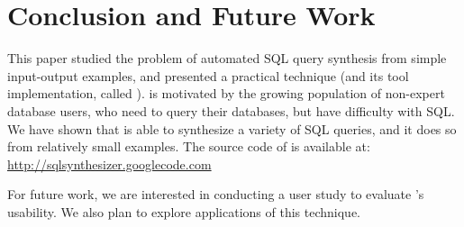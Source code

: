 \section{Conclusion and Future Work}
\label{sec:conclusion}




This paper studied the problem of automated SQL query synthesis
from simple input-output examples, and presented a
practical technique (and its tool implementation, called \ourtool).
\ourtool is motivated by the growing population of
non-expert database users, who need to query their
databases, but have difficulty with SQL.
We have shown that \ourtool is
able to synthesize a variety of SQL queries,
and it does so from relatively small examples.
The source code of \ourtool is available at: 
\url{http://sqlsynthesizer.googlecode.com}


For future work, we are interested in conducting a user study
to evaluate \ourtool's usability. We also plan to explore
applications of this technique.

\vspace{1mm}

\begin{comment}
Our future work will concentrate on the following topics:

\textbf{Enrich the supported SQL subset.} We plan to enrich the
supported SQL subset by \ourtool, and design a corresponding algorithm
to synthesize more general queries.

\textbf{Illustration of synthesis steps.} Besides
producing a final result, end-users may also be interested in knowing
how a SQL query is inferred step by step.
Showing detailed inference steps not
only makes \ourtool more usable, but also permits
end-users to better understand the whole process and
spot possible errors earlier.
We plan to apply recent advance in data visualization~\cite{Kandel:2011}
to the context of program synthesis.

\textbf{Noise detection and tolerance in users' inputs.} The current technique
requires users to provide noise-free input-output examples.
Even in the presence of a small amount of user-input noises (e.g., a typo),
the inference algorithm will declare failure when it fails to learn
a valid SQL query.
To overcome this limitation, we plan to design a more robust inference
algorithm that can attempt to identify and tolerate user-input noises,
and even suggest a fix to the noisy example.

\end{comment}


